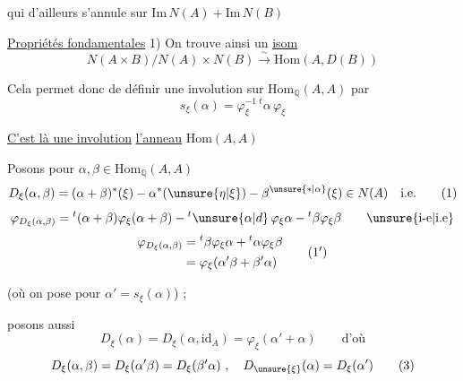 
qui d'ailleurs s'annule sur $\mathrm{Im}\,N(A)+\mathrm{Im}\,N(B)$

\uline{Propriétés fondamentales} 1) On trouve ainsi un \uline{isom}
\[
N(A\times B)/N(A)\times N(B)\xrightarrow{\sim}\mathrm{Hom}(A,D(B))
\]


 Cela permet donc de définir une involution sur $\mathrm{Hom}_{\mathbb Q}(A,A)$ par
\[
s_\xi(\alpha)=\varphi_\xi^{-1}\,{}^t\alpha\,\varphi_\xi
\]

\uline{C'est là une involution} \uline{} \uline{l'anneau} $\mathrm{Hom}(A,A)$

Posons pour $\alpha,\beta\in\mathrm{Hom}_{\mathbb Q}(A,A)$
\[
D_\xi(\alpha,\beta)=(\alpha+\beta)^*(\xi)-\alpha^*(\unsure{\eta|\xi})-\beta^{\unsure{*|\alpha}}(\xi)\in N(A)\quad\text{i.e.}
\tag*{(1)}
\]
\[
\varphi_{D_\xi(\alpha,\beta)}={}^{t}(\alpha+\beta)\varphi_\xi(\alpha+\beta)-{}^{t}\unsure{\alpha|d}\,\varphi_\xi\alpha-{}^{t}\beta\varphi_\xi\beta\qquad\text{\unsure{i-e|i.e}}
\]
\[
\begin{aligned}
\varphi_{D_\xi(\alpha,\beta)}&={}^{t}\beta\varphi_\xi\alpha+{}^{t}\alpha\varphi_\xi\beta\\
&=\varphi_\xi(\alpha'\beta+\beta'\alpha)
\end{aligned}\tag*{(1\ensuremath{^{\prime}})}
\]

(où on pose pour  $\alpha'=s_\xi(\alpha)$) ; 

posons aussi
\[
D_\xi(\alpha)=D_\xi(\alpha,\mathrm{id}_A)=\varphi_\xi(\alpha'+\alpha)\qquad\text{d'où}
\tag*{(2)}
\]
\[
D_\xi(\alpha,\beta)=D_\xi(\alpha'\beta)=D_\xi(\beta'\alpha)\ ,\quad D_{\unsure{\xi}}(\alpha)=D_\xi(\alpha')
\tag*{(3)}
\]


